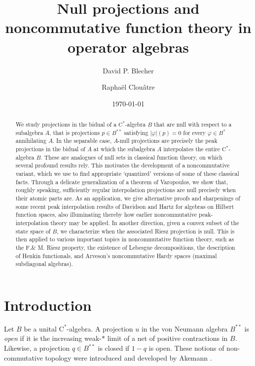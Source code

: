 \documentclass[10pt]{amsart}
\date{\today}
\author{David P. Blecher}
\author{Rapha\"el Clou\^atre}
\title[Null projections and noncommutative function theory]{Null projections and noncommutative function theory in operator algebras}
\newcommand{\rC}{\mathrm{C}}
\renewcommand{\phi}{\varphi}
\theoremstyle{definition}
\begin{document}
\begin{abstract}
We study projections in the bidual of a $\rC^*$-algebra $B$ that are null with respect to a subalgebra $A$, that is projections $p\in B^{**}$ satisfying $|\phi|(p)=0$ for every $\phi\in B^*$ annihilating $A$. In the separable case, $A$-null  projections are precisely the 
peak projections in the bidual of $A$ at which the subalgebra $A$ interpolates the entire $\rC^*$-algebra $B$.  These are analogues of null sets in classical function theory, on which several profound results rely. This motivates the development of a noncommutative variant, which we use to find appropriate `quantized' versions of some of these classical facts. 
Through a delicate generalization of a theorem of Varopoulos, we show that, roughly speaking, sufficiently regular interpolation projections are null precisely when their atomic parts are. As an application, we give alternative proofs and sharpenings of some recent peak
interpolation results of Davidson and Hartz for algebras on Hilbert function spaces, also illuminating thereby how earlier noncommutative peak-interpolation theory may be applied.
 In another direction, given a convex subset of the state space of $B$, we characterize when the associated Riesz projection is null. This is then applied to various important topics in noncommutative function theory, such as the F.\& M. Riesz property, the existence of Lebesgue decompositions, the description of Henkin functionals, and Arveson's noncommutative 
 Hardy spaces (maximal subdiagonal algebras).  
\end{abstract} 
\maketitle



\section{Introduction}

Let $B$ be a unital $\rC^*$-algebra. A projection $u$ in the von Neumann algebra $B^{**}$ is \emph{open} if it is the increasing weak-$*$ limit of a net of positive contractions in $B$. Likewise, a projection $q\in B^{**}$ is closed if $1-q$ is open. These notions of non-commutative topology were introduced and developed by Akemann  \cite{akemann1969, akemann1970left}. 
\end{document}
